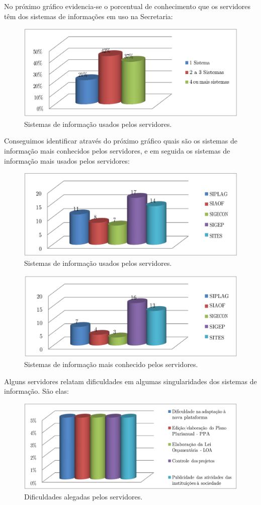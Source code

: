 \documentclass[article,12pt,onesidea,4paper,english,brazil]{abntex2}
\begin{document}
No próximo gráfico evidencia-se o porcentual de conhecimento que os servidores têm dos sistemas de informações em uso na Secretaria:

\begin{figure}[!h]
	\centering
	\includegraphics[width=.6\linewidth]{pip-173-2}
	\caption{Sistemas de informação usados pelos servidores.}
\end{figure}

Conseguimos identificar através do próximo gráfico quais são os sistemas de informação mais conhecidos pelos servidores, e em seguida os sistemas de informação mais usados pelos servidores:

	\begin{figure}[!h]
		\centering
		\includegraphics[width=.6\linewidth]{pip-173-3}
		\caption{Sistemas de informação usados pelos servidores.}
	\end{figure}

	\begin{figure}[!h]
	\centering
	\includegraphics[width=.6\linewidth]{pip-173-4}
	\caption{Sistemas de informação mais conhecido pelos servidores.}
\end{figure}

Alguns servidores relatam dificuldades em algumas singularidades dos sistemas de informação. São elas:

	\begin{figure}[!h]
	\centering
	\includegraphics[width=.6\linewidth]{pip-173-5}
	\caption{Dificuldades alegadas pelos servidores.}
\end{figure}
\end{document}
